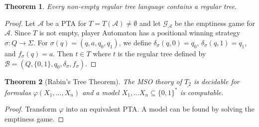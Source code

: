 \documentclass{article}
\newtheorem{theorem}{Theorem}[section]
\begin{document}
\begin{theorem}
	Every non-empty regular tree language contains a regular tree.
\end{theorem}
\begin{proof}
	Let $\mathcal{A}$ be a PTA for $T = T(\mathcal{A}) \neq \emptyset$ and let $\mathcal{G}_\mathcal{A}$ be the emptiness game for $\mathcal{A}$. Since $T$ is not empty, player Automaton has a positional winning strategy $\sigma : Q \rightarrow \Sigma$. For $\sigma(q) = (q, a, q_0, q_1)$, we define $\delta_\sigma(q, 0) = q_0$, $\delta_\sigma(q, 1) = q_1$, and $f_\sigma(q) = a$. Then $t \in T$ where $t$ is the regular tree defined by $\mathcal{B} = (Q, \{0,1\}, q_0, \delta_\sigma, f_\sigma)$.
\end{proof}

\begin{theorem}[Rabin's Tree Theorem]
	The MSO theory of $\underline{T_2}$ is decidable for formulas $\varphi(X_1, \dots, X_n)$ and a model $X_1, \dots X_n \subseteq \{0,1\}^*$ is computable.
\end{theorem}
\begin{proof}
	Transform $\varphi$ into an equivalent PTA. A model can be found by solving the emptiness game.
\end{proof}
\end{document}
